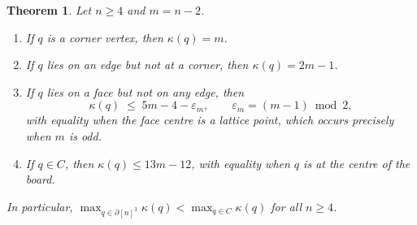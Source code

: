 \documentclass[11pt]{article}
\newtheorem{theorem}{Theorem}
\begin{document}
\begin{theorem}
\label{thm:orbit}
Let $n \geq 4$ and $m = n-2$.
\begin{enumerate}
  \item[\textnormal{(i)}] If $q$ is a corner vertex, then $\kappa(q) = m$.
  \item[\textnormal{(ii)}] If $q$ lies on an edge but not at a corner, then
        $\kappa(q) = 2m-1$.
  \item[\textnormal{(iii)}] If $q$ lies on a face but not on any edge, then
        \[
          \kappa(q) \;\leq\; 5m - 4 - \varepsilon_m,
          \qquad \varepsilon_m = (m-1)\bmod 2,
        \]
        with equality when the face centre is a lattice point, which occurs
        precisely when $m$ is odd.
  \item[\textnormal{(iv)}] If $q \in C$, then $\kappa(q) \leq 13m-12$, with
        equality when $q$ is at the centre of the board.
\end{enumerate}
In particular, $\max_{q\in\partial[n]^3}\kappa(q) < \max_{q\in C}\kappa(q)$
for all $n \geq 4$.
\end{theorem}
\end{document}
